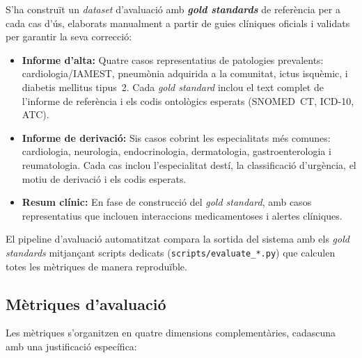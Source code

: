 \documentclass[CAT]{TFUOC}%
\begin{document}
S'ha construït un \textit{dataset} d'avaluació amb \textbf{\textit{gold standards}} de referència per a cada cas d'ús, elaborats manualment a partir de guies clíniques oficials i validats per garantir la seva correcció:

\begin{itemize}
    \item \textbf{Informe d'alta:} Quatre casos representatius de patologies prevalents: cardiologia/IAMEST, pneumònia adquirida a la comunitat, ictus isquèmic, i diabetis mellitus tipus~2. Cada \textit{gold standard} inclou el text complet de l'informe de referència i els codis ontològics esperats (SNOMED~CT, ICD-10, ATC).

    \item \textbf{Informe de derivació:} Sis casos cobrint les especialitats més comunes: cardiologia, neurologia, endocrinologia, dermatologia, gastroenterologia i reumatologia. Cada cas inclou l'especialitat destí, la classificació d'urgència, el motiu de derivació i els codis esperats.

    \item \textbf{Resum clínic:} En fase de construcció del \textit{gold standard}, amb casos representatius que inclouen interaccions medicamentoses i alertes clíniques.
\end{itemize}

El pipeline d'avaluació automatitzat compara la sortida del sistema amb els \textit{gold standards} mitjançant scripts dedicats (\texttt{scripts/evaluate\_*.py}) que calculen totes les mètriques de manera reproduïble.

\subsection{Mètriques d'avaluació}

Les mètriques s'organitzen en quatre dimensions complementàries, cadascuna amb una justificació específica:
\end{document}

